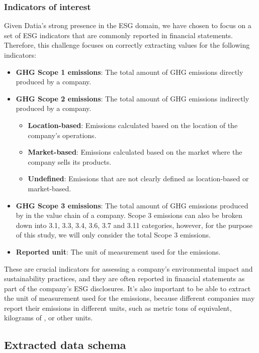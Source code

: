 \documentclass[english, 12pt, a4paper, elec, utf8, a-2b, online]{aaltothesis}
\begin{document}
\subsubsection{Indicators of interest}

Given Datia's strong presence in the \ac{ESG} domain, we have chosen to focus on a set of \ac{ESG} indicators that are commonly reported in financial statements.
Therefore, this challenge focuses on correctly extracting values for the following indicators:

\begin{itemize}
    \item \textbf{\ac{GHG} Scope 1 emissions}: The total amount of \ac{GHG} emissions directly produced by a company.
    \item \textbf{\ac{GHG} Scope 2 emissions}: The total amount of \ac{GHG} emissions indirectly produced by a company.
            \begin{itemize}
                \item \textbf{Location-based}: Emissions calculated based on the location of the company's operations.
                \item \textbf{Market-based}: Emissions calculated based on the market where the company sells its products.
                \item \textbf{Undefined}: Emissions that are not clearly defined as location-based or market-based.
            \end{itemize}
    \item \textbf{\ac{GHG} Scope 3 emissions}: The total amount of \ac{GHG} emissions produced by in the value chain of a company. Scope 3 emissions can also be broken down into 3.1, 3.3, 3.4, 3.6, 3.7 and 3.11 categories, however, for the purpose of this study, we will only consider the total Scope 3 emissions.
    \item \textbf{Reported unit}: The unit of measurement used for the emissions.
\end{itemize}

These are crucial indicators for assessing a company's environmental impact and sustainability practices, and they are often reported in financial statements as part of the company's \ac{ESG} disclosures.
It's also important to be able to extract the unit of measurement used for the emissions, because different companies may report their emissions in different units, such as metric tons of  equivalent, kilograms of , or other units.

\subsection{Extracted data schema}
\end{document}
